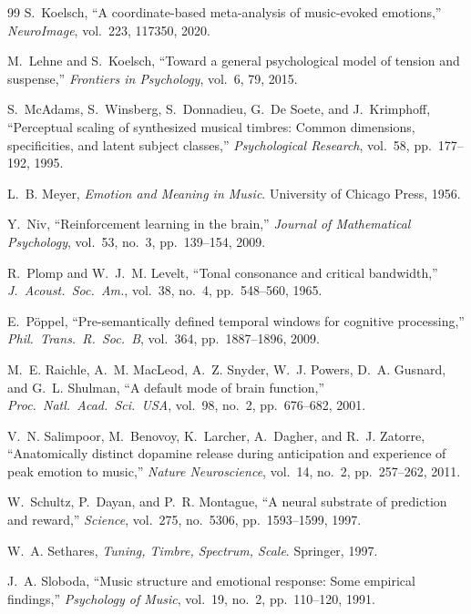 \documentclass[10pt,twocolumn]{article}
\begin{document}
\begin{thebibliography}{99}
S.~Koelsch, ``A coordinate-based meta-analysis of music-evoked emotions,'' \textit{NeuroImage}, vol.~223, 117350, 2020.

M.~Lehne and S.~Koelsch, ``Toward a general psychological model of tension and suspense,'' \textit{Frontiers in Psychology}, vol.~6, 79, 2015.

S.~McAdams, S.~Winsberg, S.~Donnadieu, G.~De Soete, and J.~Krimphoff, ``Perceptual scaling of synthesized musical timbres: Common dimensions, specificities, and latent subject classes,'' \textit{Psychological Research}, vol.~58, pp.~177--192, 1995.

L.~B. Meyer, \textit{Emotion and Meaning in Music}. University of Chicago Press, 1956.

Y.~Niv, ``Reinforcement learning in the brain,'' \textit{Journal of Mathematical Psychology}, vol.~53, no.~3, pp.~139--154, 2009.

R.~Plomp and W.~J.~M. Levelt, ``Tonal consonance and critical bandwidth,'' \textit{J.\ Acoust.\ Soc.\ Am.}, vol.~38, no.~4, pp.~548--560, 1965.

E.~P\"{o}ppel, ``Pre-semantically defined temporal windows for cognitive processing,'' \textit{Phil.\ Trans.\ R.\ Soc.\ B}, vol.~364, pp.~1887--1896, 2009.

M.~E. Raichle, A.~M. MacLeod, A.~Z. Snyder, W.~J. Powers, D.~A. Gusnard, and G.~L. Shulman, ``A default mode of brain function,'' \textit{Proc.\ Natl.\ Acad.\ Sci.\ USA}, vol.~98, no.~2, pp.~676--682, 2001.

V.~N. Salimpoor, M.~Benovoy, K.~Larcher, A.~Dagher, and R.~J. Zatorre, ``Anatomically distinct dopamine release during anticipation and experience of peak emotion to music,'' \textit{Nature Neuroscience}, vol.~14, no.~2, pp.~257--262, 2011.

W.~Schultz, P.~Dayan, and P.~R. Montague, ``A neural substrate of prediction and reward,'' \textit{Science}, vol.~275, no.~5306, pp.~1593--1599, 1997.

W.~A. Sethares, \textit{Tuning, Timbre, Spectrum, Scale}. Springer, 1997.

J.~A. Sloboda, ``Music structure and emotional response: Some empirical findings,'' \textit{Psychology of Music}, vol.~19, no.~2, pp.~110--120, 1991.


\end{thebibliography}
\end{document}
